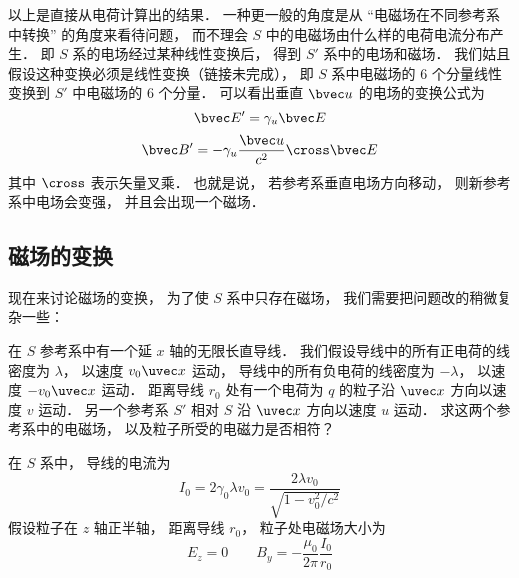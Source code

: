以上是直接从电荷计算出的结果． 一种更一般的角度是从 “电磁场在不同参考系中转换” 的角度来看待问题， 而不理会 $S$ 中的电磁场由什么样的电荷电流分布产生． 即 $S$ 系的电场经过某种线性变换后， 得到 $S'$ 系中的电场和磁场． 我们姑且假设这种变换必须是线性变换（链接未完成）， 即 $S$ 系中电磁场的 6 个分量线性变换到 $S'$ 中电磁场的 6 个分量． 可以看出垂直 $\bvec u$ 的电场的变换公式为
\begin{equation}\label{EMRef_eq5}
\bvec E' = \gamma_u \bvec E
\end{equation}
\begin{equation}\label{EMRef_eq6}
\bvec B' = -\gamma_u \frac{\bvec u}{c^2} \cross \bvec E
\end{equation}
其中 $\cross$ 表示矢量叉乘． 也就是说， 若参考系垂直电场方向移动， 则新参考系中电场会变强， 并且会出现一个磁场．


\subsection{磁场的变换}
现在来讨论磁场的变换， 为了使 $S$ 系中只存在磁场， 我们需要把问题改的稍微复杂一些：

在 $S$ 参考系中有一个延 $x$ 轴的无限长直导线． 我们假设导线中的所有正电荷的线密度为 $\lambda$， 以速度 $v_0\uvec x$ 运动， 导线中的所有负电荷的线密度为 $-\lambda$，  以速度 $-v_0\uvec x$ 运动． 距离导线 $r_0$ 处有一个电荷为 $q$ 的粒子沿 $\uvec x$ 方向以速度 $v$ 运动． 另一个参考系 $S'$ 相对 $S$ 沿 $\uvec x$ 方向以速度 $u$ 运动． 求这两个参考系中的电磁场， 以及粒子所受的电磁力是否相符？

在 $S$ 系中， 导线的电流为
\begin{equation}
I_0 = 2 \gamma_0 \lambda v_0 = \frac{2 \lambda v_0}{\sqrt{1 - v_0^2/c^2}}
\end{equation}
假设粒子在 $z$ 轴正半轴， 距离导线 $r_0$， 粒子处电磁场大小为
\begin{equation}
E_z = 0 \qquad B_y = -\frac{\mu_0}{2\pi} \frac{I_0}{r_0}
\end{equation}

